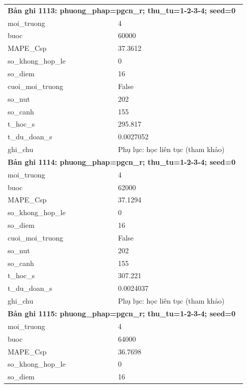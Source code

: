 \begin{longtable}{p{0.43\linewidth}p{0.50\linewidth}}
\midrule
\multicolumn{2}{p{0.95\linewidth}}{\textbf{Bản ghi 1113: phuong\_phap=pgcn\_r; thu\_tu=1-2-3-4; seed=0}} \\
moi\_\allowbreak truong & 4 \\
buoc & 60000 \\
MAPE\_\allowbreak Csp & 37.3612 \\
so\_\allowbreak khong\_\allowbreak hop\_\allowbreak le & 0 \\
so\_\allowbreak diem & 16 \\
cuoi\_\allowbreak moi\_\allowbreak truong & False \\
so\_\allowbreak nut & 202 \\
so\_\allowbreak canh & 155 \\
t\_\allowbreak hoc\_\allowbreak s & 295.817 \\
t\_\allowbreak du\_\allowbreak doan\_\allowbreak s & 0.0027052 \\
ghi\_\allowbreak chu & Phụ lục: học liên tục (tham khảo) \\
\midrule
\multicolumn{2}{p{0.95\linewidth}}{\textbf{Bản ghi 1114: phuong\_phap=pgcn\_r; thu\_tu=1-2-3-4; seed=0}} \\
moi\_\allowbreak truong & 4 \\
buoc & 62000 \\
MAPE\_\allowbreak Csp & 37.1294 \\
so\_\allowbreak khong\_\allowbreak hop\_\allowbreak le & 0 \\
so\_\allowbreak diem & 16 \\
cuoi\_\allowbreak moi\_\allowbreak truong & False \\
so\_\allowbreak nut & 202 \\
so\_\allowbreak canh & 155 \\
t\_\allowbreak hoc\_\allowbreak s & 307.221 \\
t\_\allowbreak du\_\allowbreak doan\_\allowbreak s & 0.0024037 \\
ghi\_\allowbreak chu & Phụ lục: học liên tục (tham khảo) \\
\midrule
\multicolumn{2}{p{0.95\linewidth}}{\textbf{Bản ghi 1115: phuong\_phap=pgcn\_r; thu\_tu=1-2-3-4; seed=0}} \\
moi\_\allowbreak truong & 4 \\
buoc & 64000 \\
MAPE\_\allowbreak Csp & 36.7698 \\
so\_\allowbreak khong\_\allowbreak hop\_\allowbreak le & 0 \\
so\_\allowbreak diem & 16 \\

\end{longtable}
